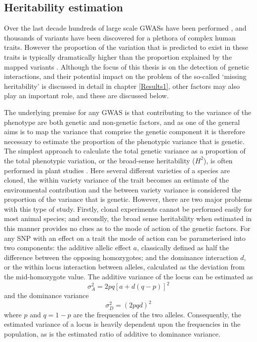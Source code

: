 \subsection{Heritability estimation}

Over the last decade hundreds of large scale GWASs have been performed \citep{Hindorff2010}, and thousands of variants have been discovered for a plethora of complex human traits. However the proportion of the variation that is predicted to exist in these traits is typically dramatically higher than the proportion explained by the mapped variants \citep{Maher2008}. Although the focus of this thesis is on the detection of genetic interactions, and their potential impact on the problem of the so-called `missing heritability' is discussed in detail in chapter \ref{Results1}, other factors may also play an important role, and these are discussed below.

The underlying premise for any GWAS is that contributing to the variance of the phenotype are both genetic and non-genetic factors, and as one of the general aims is to map the variance that comprise the genetic component it is therefore necessary to estimate the proportion of the phenotypic variance that is genetic. The simplest approach to calculate the total genetic variance as a proportion of the total phenotypic variation, or the broad-sense heritability ($H^2$), is often performed in plant studies \citep{Soleri2002, Nordborg2008, Xu2009}. Here several different varieties of a species are cloned, the within variety variance of the trait becomes an estimate of the environmental contribution and the between variety variance is considered the proportion of the variance that is genetic. However, there are two major problems with this type of study. Firstly, clonal experiments cannot be performed easily for most animal species; and secondly, the broad sense heritability when estimated in this manner provides no clues as to the mode of action of the genetic factors. For any SNP with an effect on a trait the mode of action can be parameterised into two components: the additive allelic effect $a$, classically defined as half the difference between the opposing homozygotes; and the dominance interaction $d$, or the within locus interaction between alleles, calculated as the deviation from the mid-homozygote value. The additive variance of the locus can be estimated as
\begin{equation}
\sigma^{2}_{A} = 2pq[a + d(q - p)]^{2}
\end{equation}
and the dominance variance
\begin{equation}
\sigma^{2}_{D} = (2pqd)^{2}
\end{equation}
where $p$ and $q = 1 - p$ are the frequencies of the two alleles. Consequently, the estimated variance of a locus is heavily dependent upon the frequencies in the population, as is the estimated ratio of additive to dominance variance.

